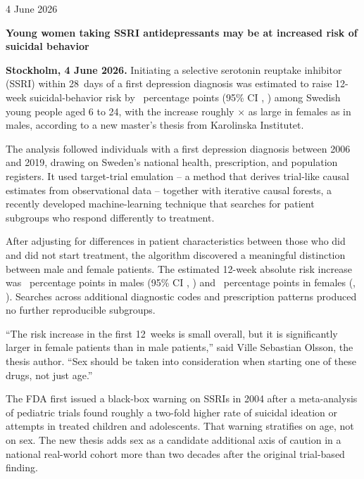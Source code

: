 \documentclass[11pt,a4paper]{article}
\begin{document}
\hfill 4 June 2026

\bigskip

{\LARGE\bfseries Young women taking SSRI antidepressants may be at increased risk of suicidal behavior}

\medskip



\noindent\textbf{Stockholm, 4 June 2026.} Initiating a selective serotonin
reuptake inhibitor (SSRI) within 28~days of a first depression diagnosis was
estimated to raise 12-week suicidal-behavior risk by \ittRD~percentage
points (95\% CI \ittRDLower, \ittRDUpper) among Swedish young people aged
6 to 24, with the increase roughly \icfCATEratio$\times$ as large in
females as in males, according to a new master's thesis from Karolinska
Institutet.

The analysis followed \studyN{} individuals with a first depression
diagnosis between 2006 and 2019, drawing on Sweden's national health,
prescription, and population registers. It used target-trial emulation -- a
method that derives trial-like causal estimates from observational data --
together with iterative causal forests, a recently developed
machine-learning technique that searches for patient subgroups who respond
differently to treatment.

After adjusting for differences in patient characteristics between those who
did and did not start treatment, the algorithm discovered a meaningful
distinction between male and female patients. The estimated 12-week absolute
risk increase was \icfSGACATE~percentage points in males (95\% CI
\icfSGACILower, \icfSGACIUpper) and \icfSGBCATE~percentage points in
females (\icfSGBCILower, \icfSGBCIUpper). Searches across additional
diagnostic codes and prescription patterns produced no further reproducible
subgroups.

``The risk increase in the first 12~weeks is small overall, but it is
significantly larger in female patients than in male patients,'' said Ville
Sebastian Olsson, the thesis author. ``Sex should be taken into consideration
when starting one of these drugs, not just age.''

The FDA first issued a black-box warning on SSRIs in 2004 after a
meta-analysis of pediatric trials found roughly a two-fold higher rate of
suicidal ideation or attempts in treated children and adolescents. That
warning stratifies on age, not on sex. The new thesis adds sex as a
candidate additional axis of caution in a national real-world cohort more
than two decades after the original trial-based finding.
\end{document}
